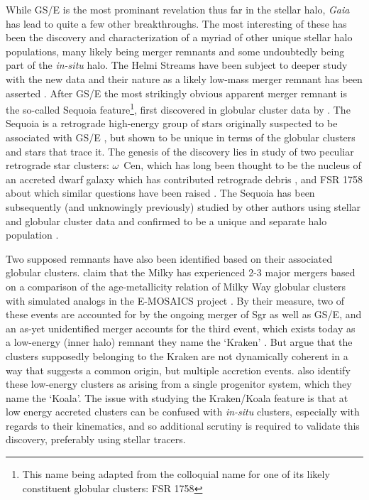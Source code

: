 While GS/E is the most prominant revelation thus far in the stellar halo, \textit{Gaia} has lead to quite a few other breakthroughs. The most interesting of these has been the discovery and characterization of a myriad of other unique stellar halo populations, many likely being merger remnants and some undoubtedly being part of the \textit{in-situ} halo. The Helmi Streams \parencite{helmi99} have been subject to deeper study with the new data and their nature as a likely low-mass merger remnant has been asserted \parencite{koppelman19a}. After GS/E the most strikingly obvious apparent merger remnant is the so-called Sequoia feature\footnote{This name being adapted from the colloquial name for one of its likely constituent globular clusters: FSR 1758}, first discovered in globular cluster data by \textcite{myeong19}. The Sequoia is a retrograde high-energy group of stars originally suspected to be associated with GS/E \parencite{helmi18}, but shown to be unique in terms of the globular clusters and stars that trace it. The genesis of the discovery lies in  study of two peculiar retrograde star clusters: $\omega$~Cen, which has long been thought to be the nucleus of an accreted dwarf galaxy which has contributed retrograde debris \parencite{bekki03,majewski12}, and FSR 1758 about which similar questions have been raised \parencite{froebrich07,barba19}. The Sequoia has been subsequently (and unknowingly previously) studied by other authors using stellar and globular cluster data and confirmed to be a unique and separate halo population \parencite{koppelman19b,kruijssen20,monty20,naidu20}.

Two supposed remnants have also been identified based on their associated globular clusters. \textcite{kruijssen19b} claim that the Milky has experienced 2-3 major mergers based on a comparison of the age-metallicity relation of Milky Way globular clusters with simulated analogs in the E-MOSAICS project \parencite{kruijssen19a}. By their measure, two of these events are accounted for by the ongoing merger of Sgr as well as GS/E, and an as-yet unidentified merger accounts for the third event, which exists today as a low-energy (inner halo) remnant they name the `Kraken' \parencite{kruijssen20}. But \textcite{massari19} argue that the clusters supposedly belonging to the Kraken are not dynamically coherent in a way that suggests a common origin, but multiple accretion events. \textcite{forbes20} also identify these low-energy clusters as arising from a single progenitor system, which they name the `Koala'. The issue with studying the Kraken/Koala feature is that at low energy accreted clusters can be confused with \textit{in-situ} clusters, especially with regards to their kinematics, and so additional scrutiny is required to validate this discovery, preferably using stellar tracers.

